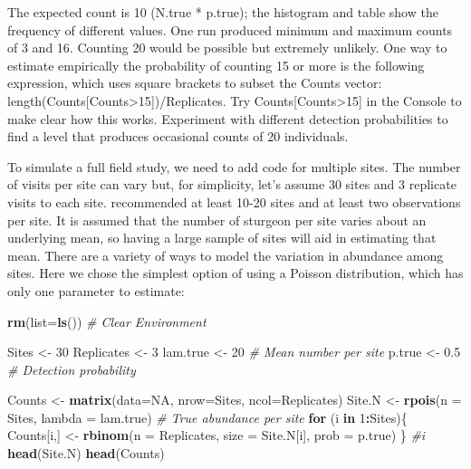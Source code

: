 \documentclass[
]{krantz}
\makeatletter
\newenvironment{Shaded}{\begin{snugshade}}{\end{snugshade}}
\newcommand{\AttributeTok}[1]{\textcolor[rgb]{0.27,0.27,0.27}{#1}}
\newcommand{\CommentTok}[1]{\textcolor[rgb]{0.37,0.37,0.37}{\textit{#1}}}
\newcommand{\ConstantTok}[1]{\textcolor[rgb]{0.37,0.37,0.37}{#1}}
\newcommand{\ControlFlowTok}[1]{\textcolor[rgb]{0.27,0.27,0.27}{\textbf{#1}}}
\newcommand{\DecValTok}[1]{\textcolor[rgb]{0.06,0.06,0.06}{#1}}
\newcommand{\FloatTok}[1]{\textcolor[rgb]{0.06,0.06,0.06}{#1}}
\newcommand{\FunctionTok}[1]{\textcolor[rgb]{0.27,0.27,0.27}{\textbf{#1}}}
\newcommand{\NormalTok}[1]{#1}
\newcommand{\OtherTok}[1]{\textcolor[rgb]{0.37,0.37,0.37}{#1}}
\newcommand{\SpecialCharTok}[1]{\textcolor[rgb]{0.43,0.43,0.43}{\textbf{#1}}}
\newenvironment{kframe}{%
\medskip{}
\setlength{\fboxsep}{.8em}
 \def\at@end@of@kframe{}%
 \ifinner\ifhmode%
  \def\at@end@of@kframe{\end{minipage}}%
  \begin{minipage}{\columnwidth}%
 \fi\fi%
 \def\FrameCommand##1{\hskip\@totalleftmargin \hskip-\fboxsep
 \colorbox{shadecolor}{##1}\hskip-\fboxsep
     \hskip-\linewidth \hskip-\@totalleftmargin \hskip\columnwidth}%
 \MakeFramed {\advance\hsize-\width
   \@totalleftmargin\z@ \linewidth\hsize
   \@setminipage}}%
 {\par\unskip\endMakeFramed%
 \at@end@of@kframe}
\renewenvironment{Shaded}{\begin{kframe}}{\end{kframe}}
\makeatother
\begin{document}
The expected count is 10 (N.true * p.true); the histogram and table show the frequency of different values. One run produced minimum and maximum counts of 3 and 16. Counting 20 would be possible but extremely unlikely. One way to estimate empirically the probability of counting 15 or more is the following expression, which uses square brackets to subset the Counts vector: length(Counts{[}Counts\textgreater15{]})/Replicates. Try Counts{[}Counts\textgreater15{]} in the Console to make clear how this works. Experiment with different detection probabilities to find a level that produces occasional counts of 20 individuals.

To simulate a full field study, we need to add code for multiple sites. The number of visits per site can vary but, for simplicity, let's assume 30 sites and 3 replicate visits to each site. \citet{kéry.schaub_2012} recommended at least 10-20 sites and at least two observations per site. It is assumed that the number of sturgeon per site varies about an underlying mean, so having a large sample of sites will aid in estimating that mean. There are a variety of ways to model the variation in abundance among sites. Here we chose the simplest option of using a Poisson distribution, which has only one parameter to estimate:

\begin{Shaded}
\begin{Highlighting}[]
\FunctionTok{rm}\NormalTok{(}\AttributeTok{list=}\FunctionTok{ls}\NormalTok{()) }\CommentTok{\# Clear Environment}

\NormalTok{Sites }\OtherTok{\textless{}{-}} \DecValTok{30}
\NormalTok{Replicates }\OtherTok{\textless{}{-}} \DecValTok{3}
\NormalTok{lam.true }\OtherTok{\textless{}{-}} \DecValTok{20} \CommentTok{\# Mean number per site}
\NormalTok{p.true }\OtherTok{\textless{}{-}} \FloatTok{0.5} \CommentTok{\# Detection probability}

\NormalTok{Counts }\OtherTok{\textless{}{-}} \FunctionTok{matrix}\NormalTok{(}\AttributeTok{data=}\ConstantTok{NA}\NormalTok{, }\AttributeTok{nrow=}\NormalTok{Sites, }\AttributeTok{ncol=}\NormalTok{Replicates)}
\NormalTok{Site.N }\OtherTok{\textless{}{-}} \FunctionTok{rpois}\NormalTok{(}\AttributeTok{n =}\NormalTok{ Sites, }\AttributeTok{lambda =}\NormalTok{ lam.true) }\CommentTok{\# True abundance per site}
\ControlFlowTok{for}\NormalTok{ (i }\ControlFlowTok{in} \DecValTok{1}\SpecialCharTok{:}\NormalTok{Sites)\{}
\NormalTok{  Counts[i,] }\OtherTok{\textless{}{-}} \FunctionTok{rbinom}\NormalTok{(}\AttributeTok{n =}\NormalTok{ Replicates, }\AttributeTok{size =}\NormalTok{ Site.N[i], }\AttributeTok{prob =}\NormalTok{ p.true)}
\NormalTok{  \} }\CommentTok{\#i}
\FunctionTok{head}\NormalTok{(Site.N)}
\FunctionTok{head}\NormalTok{(Counts)}
\end{Highlighting}
\end{Shaded}
\end{document}
